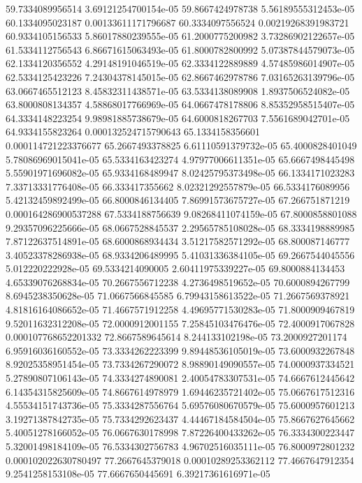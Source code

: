 {59.7334089956514 3.69121254700154e-05
59.8667424978738 5.56189555312453e-05
60.1334095023187 0.00133611171796687
60.3334097556524 0.00219268391983721
60.9334105156533 5.86017880239555e-05
61.2000775200982 3.73286902122657e-05
61.5334112756543 6.86671615063493e-05
61.8000782800992 5.07387844579073e-05
62.1334120356552 4.29148191046519e-05
62.3334122889889 4.57485986014907e-05
62.5334125423226 7.24304378145015e-05
62.8667462978786 7.03165263139796e-05
63.0667465512123 8.45832311438571e-05
63.5334138089908 1.8937506524082e-05
63.8000808134357 4.58868017766969e-05
64.0667478178806 8.85352958515407e-05
64.3334148223254 9.98981885738679e-05
64.6000818267703 7.5561689042701e-05
64.9334155823264 0.000132524715790643
65.1334158356601 0.000114721223376677
65.2667493378825 6.61110591379732e-05
65.4000828401049 5.78086969015041e-05
65.5334163423274 4.97977006611351e-05
65.6667498445498 5.55901971696082e-05
65.9334168489947 8.02425795373498e-05
66.1334171023283 7.33713331776408e-05
66.333417355662 8.02321292557879e-05
66.5334176089956 5.42132459892499e-05
66.8000846134405 7.86991573675727e-05
67.266751871219 0.000164286900537288
67.5334188756639 9.08268411074159e-05
67.8000858801088 9.29357096225666e-05
68.0667528845537 2.29565785108028e-05
68.3334198889985 7.87122637514891e-05
68.6000868934434 3.51217582571292e-05
68.800087146777 3.40523378286938e-05
68.9334206489995 5.41031336384105e-05
69.2667544045556 5.012220222928e-05
69.5334214090005 2.60411975339227e-05
69.8000884134453 4.65339076268834e-05
70.2667556712238 4.2736498519652e-05
70.6000894267799 8.6945238350628e-05
71.0667566845585 6.79943158613522e-05
71.2667569378921 4.81816164086652e-05
71.4667571912258 4.49695771530283e-05
71.8000909467819 9.52011632312208e-05
72.0000912001155 7.25845103476476e-05
72.4000917067828 0.000107768652201332
72.8667589645614 8.244133102198e-05
73.2000927201174 6.95916036160552e-05
73.3334262223399 9.89448536105019e-05
73.6000932267848 8.92025358951454e-05
73.7334267290072 8.98890149090557e-05
74.0000937334521 5.27890807106143e-05
74.3334274890081 2.40054783307531e-05
74.6667612445642 6.14354315825609e-05
74.8667614978979 1.69446235721402e-05
75.0667617512316 4.55534151743736e-05
75.3334287556764 5.69576080670579e-05
75.6000957601213 3.19271387842735e-05
75.7334292623437 4.44467184584504e-05
75.8667627645662 5.40051278166052e-05
76.0667630178998 7.87226400433262e-05
76.3334300223447 5.32001498184109e-05
76.5334302756783 4.96702516035111e-05
76.8000972801232 0.000102022630780497
77.2667645379018 0.00010289253362112
77.4667647912354 9.2541258153108e-05
77.6667650445691 6.39217361616971e-05
}
